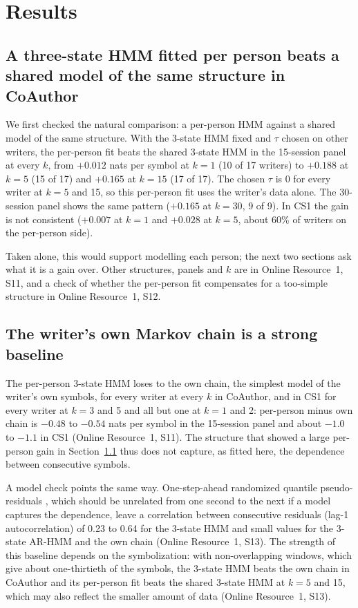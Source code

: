 \documentclass[pdflatex,sn-basic]{sn-jnl}
\newcommand{\Sref}[1]{Online Resource~1, S#1}
\newcommand{\hmmthree}{\mbox{3-state} HMM}
\newcommand{\arthree}{\mbox{3-state} \mbox{AR-HMM}}
\begin{document}
\section{Results}\label{sec:results}

\subsection{A three-state HMM fitted per person beats a shared model of the same structure in CoAuthor}\label{sec:res-hmm}
We first checked the natural comparison: a per-person HMM against a shared model of the same structure. With the \hmmthree{} fixed and $\tau$ chosen on other writers, the per-person fit beats the shared \hmmthree{} in the 15-session panel at every $k$, from $+0.012$ nats per symbol at $k=1$ (10 of 17 writers) to $+0.188$ at $k=5$ (15 of 17) and $+0.165$ at $k=15$ (17 of 17). The chosen $\tau$ is 0 for every writer at $k=5$ and 15, so this per-person fit uses the writer's data alone. The 30-session panel shows the same pattern ($+0.165$ at $k=30$, 9 of 9). In CS1 the gain is not consistent ($+0.007$ at $k=1$ and $+0.028$ at $k=5$, about 60\% of writers on the per-person side).

Taken alone, this would support modelling each person; the next two sections ask what it is a gain over. Other structures, panels and $k$ are in \Sref{11}, and a check of whether the per-person fit compensates for a too-simple structure in \Sref{12}.

\subsection{The writer's own Markov chain is a strong baseline}\label{sec:res-chain}
The per-person \hmmthree{} loses to the own chain, the simplest model of the writer's own symbols, for every writer at every $k$ in CoAuthor, and in CS1 for every writer at $k=3$ and 5 and all but one at $k=1$ and 2: per-person minus own chain is $-0.48$ to $-0.54$ nats per symbol in the 15-session panel and about $-1.0$ to $-1.1$ in CS1 (\Sref{11}). The structure that showed a large per-person gain in Section~\ref{sec:res-hmm} thus does not capture, as fitted here, the dependence between consecutive symbols.

A model check points the same way. One-step-ahead randomized quantile pseudo-residuals \citep{Dunn1996}, which should be unrelated from one second to the next if a model captures the dependence, leave a correlation between consecutive residuals (lag-1 autocorrelation) of 0.23 to 0.64 for the \hmmthree{} and small values for the \arthree{} and the own chain (\Sref{13}). The strength of this baseline depends on the symbolization: with non-overlapping windows, which give about one-thirtieth of the symbols, the \hmmthree{} beats the own chain in CoAuthor and its per-person fit beats the shared \hmmthree{} at $k=5$ and 15, which may also reflect the smaller amount of data (\Sref{13}).
\end{document}
